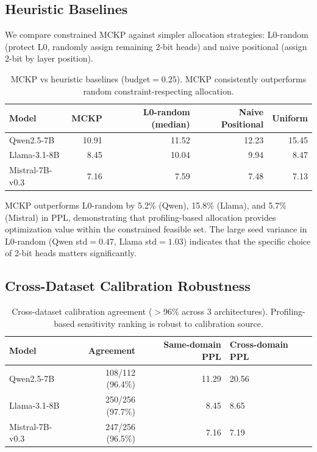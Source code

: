 \documentclass[11pt,a4paper]{article}
\begin{document}
\subsection{Heuristic Baselines}

We compare constrained MCKP against simpler allocation strategies: L0-random (protect L0, randomly assign remaining 2-bit heads) and naive positional (assign 2-bit by layer position).

\begin{table}[h]
\centering
\caption{MCKP vs heuristic baselines (budget$=0.25$). MCKP consistently outperforms random constraint-respecting allocation.}
\label{tab:heuristic_baselines}
\begin{tabular}{@{}lrrrr@{}}
\toprule
Model & MCKP & L0-random (median) & Naive Positional & Uniform \\
\midrule
Qwen2.5-7B  & 10.91 & 11.52 & 12.23 & 15.45 \\
Llama-3.1-8B & 8.45 & 10.04 & 9.94 & 8.47 \\
Mistral-7B-v0.3 & 7.16 & 7.59 & 7.48 & 7.13 \\
\bottomrule
\end{tabular}
\end{table}

MCKP outperforms L0-random by 5.2\% (Qwen), 15.8\% (Llama), and 5.7\% (Mistral) in PPL, demonstrating that profiling-based allocation provides optimization value within the constrained feasible set.
The large seed variance in L0-random (Qwen std$=0.47$, Llama std$=1.03$) indicates that the specific choice of 2-bit heads matters significantly.

\subsection{Cross-Dataset Calibration Robustness}

\begin{table}[h]
\centering
\caption{Cross-dataset calibration agreement ($>$96\% across 3 architectures). Profiling-based sensitivity ranking is robust to calibration source.}
\label{tab:cross_dataset}
\begin{tabular}{@{}lrrl@{}}
\toprule
Model & Agreement & Same-domain PPL & Cross-domain PPL \\
\midrule
Qwen2.5-7B  & 108/112 (96.4\%) & 11.29 & 20.56 \\
Llama-3.1-8B & 250/256 (97.7\%) & 8.45 & 8.65 \\
Mistral-7B-v0.3 & 247/256 (96.5\%) & 7.16 & 7.19 \\
\bottomrule
\end{tabular}
\end{table}
\end{document}
